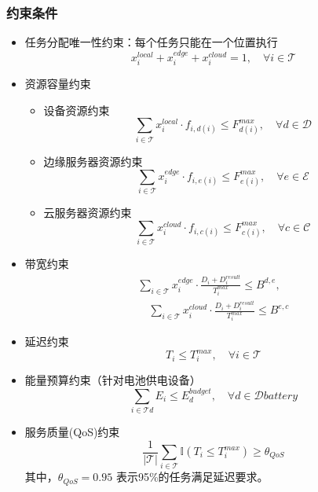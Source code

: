 \documentclass[conference]{IEEEtran}
\begin{document}
\subsubsection{约束条件}
\begin{itemize}
    \item 任务分配唯一性约束：每个任务只能在一个位置执行
        \begin{equation}
        x_i^{local} + x_i^{edge} + x_i^{cloud} = 1, \quad \forall i \in \mathcal{T}
        \end{equation}
    \item 资源容量约束
    \begin{itemize}
        \item 设备资源约束
            \begin{equation}
            \sum_{i \in \mathcal{T}} x_i^{local} \cdot f_{i,d(i)} \leq F_{d(i)}^{max}, \quad \forall d \in \mathcal{D}
            \end{equation}
        \item 边缘服务器资源约束
            \begin{equation}
            \sum_{i \in \mathcal{T}} x_i^{edge} \cdot f_{i,e(i)} \leq F_{e(i)}^{max}, \quad \forall e \in \mathcal{E}
            \end{equation}
        \item 云服务器资源约束
            \begin{equation}
            \sum_{i \in \mathcal{T}} x_i^{cloud} \cdot f_{i,c(i)} \leq F_{c(i)}^{max}, \quad \forall c \in \mathcal{C}
            \end{equation}
    \end{itemize}
    \item 带宽约束
        \begin{equation}
        \begin{split}
            \sum_{i \in \mathcal{T}} x_i^{edge} \cdot \frac{D_i + D_i^{result}}{T_i^{max}} \leq B^{d,e}, \\
            \quad \sum_{i \in \mathcal{T}} x_i^{cloud} \cdot \frac{D_i + D_i^{result}}{T_i^{max}} \leq B^{e,c}
        \end{split}
        \end{equation}
    \item 延迟约束  
        \begin{equation}
        T_i \leq T_i^{max}, \quad \forall i \in \mathcal{T}
        \end{equation}
    \item 能量预算约束（针对电池供电设备）      
        \begin{equation}
        \sum_{i \in \mathcal{T}d} E_i \leq E_d^{budget}, \quad \forall d \in \mathcal{D}{battery}
        \end{equation}
    \item 服务质量(QoS)约束
        \begin{equation}
        \frac{1}{|\mathcal{T}|} \sum_{i \in \mathcal{T}} \mathbb{I}(T_i \leq T_i^{max}) \geq \theta_{QoS}
        \end{equation}
        其中，$\mathcal{\theta}_{QoS} = 0.95$ 表示95\%的任务满足延迟要求。
\end{itemize}
\end{document}
